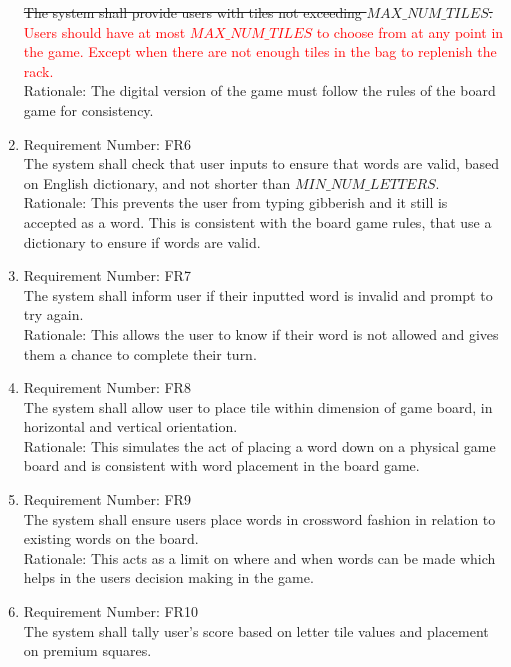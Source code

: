 \documentclass[12pt, titlepage]{article}
\begin{document}
\begin{enumerate}
    \sout{The system shall provide users with tiles not exceeding $MAX\_NUM\_TILES$.} \textcolor{red}{Users should have at most $MAX\_NUM\_TILES$ to choose from at any point in the game. Except when there are not enough tiles in the bag to replenish the rack.}\\
    Rationale: The digital version of the game must follow the rules of the board game for consistency.\\
    \item 
    Requirement Number: FR6 \\
    The system shall check that user inputs to ensure that words are valid, based on English dictionary, and not shorter than $MIN\_NUM\_LETTERS$. \\
    Rationale: This prevents the user from typing gibberish and it still is accepted as a word. This is consistent with the board game rules, that use a dictionary to ensure if words are valid.\\
    \item 
     Requirement Number: FR7 \\
     The system shall inform user if their inputted word is invalid and prompt to try again.\\
     Rationale: This allows the user to know if their word is not allowed and gives them a chance to complete their turn.\\
    \item 
     Requirement Number: FR8 \\ %
     The system shall allow user to place tile within dimension of game board, in horizontal and vertical orientation.\\
     Rationale: This simulates the act of placing a word down on a physical game board and is consistent with word placement in the board game.\\
    \item
    Requirement Number: FR9 \\
    The system shall ensure users place words in crossword fashion in relation to existing words on the board.\\
    Rationale: This acts as a limit on where and when words can be made which helps in the users decision making in the game.\\
    \item 
    Requirement Number: FR10 \\
    The system shall tally user's score based on letter tile values and placement on premium squares.\\

\end{enumerate}
\end{document}
